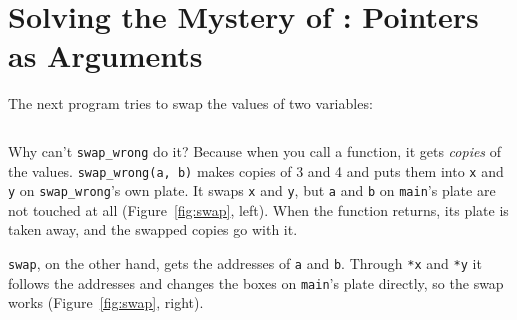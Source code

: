 \section{Solving the Mystery of \texorpdfstring{}{scanf}: Pointers as Arguments}
\label{sec:swap}

The next program tries to swap the values of two variables:


\inputminted[linenos=false]{text}{code/en/ch04/out/swap.txt}

Why can't \texttt{swap\_wrong} do it? Because when you call a function, it gets \emph{copies} of the values. \texttt{swap\_wrong(a, b)} makes copies of 3 and 4 and puts them into \texttt{x} and \texttt{y} on \texttt{swap\_wrong}'s own plate. It swaps \texttt{x} and \texttt{y}, but \texttt{a} and \texttt{b} on \texttt{main}'s plate are not touched at all (Figure~\ref{fig:swap}, left). When the function returns, its plate is taken away, and the swapped copies go with it.

\texttt{swap}, on the other hand, gets the addresses of \texttt{a} and \texttt{b}. Through \texttt{*x} and \texttt{*y} it follows the addresses and changes the boxes on \texttt{main}'s plate directly, so the swap works (Figure~\ref{fig:swap}, right).

